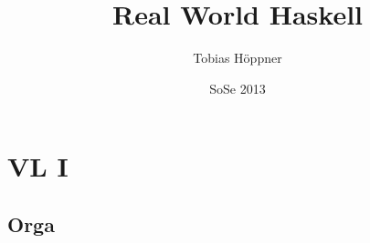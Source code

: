 \documentclass[ngerman]{report}
\author{Tobias Höppner}
\title{Real World Haskell}
\date{SoSe 2013}
\begin{document}
\maketitle
\tableofcontents
\chapter{VL I}
\section{Orga}
\end{document}
